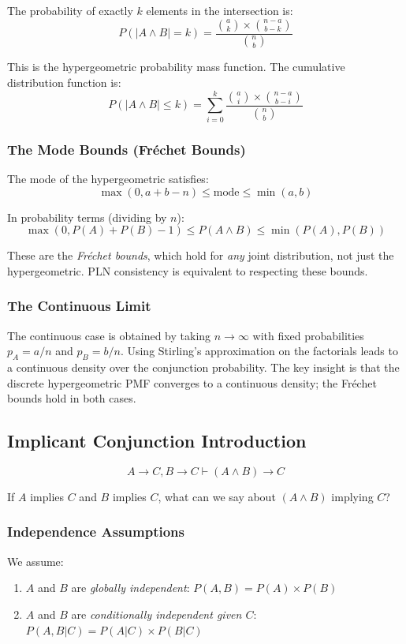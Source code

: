 \documentclass[]{article}
\begin{document}
The probability of exactly $k$ elements in the intersection is:
$$P(|A\land B|=k) = \frac{\binom{a}{k} \times \binom{n-a}{b-k}}{\binom{n}{b}}$$

This is the hypergeometric probability mass function.  The cumulative
distribution function is:
$$P(|A\land B| \leq k) = \sum_{i=0}^k \frac{\binom{a}{i} \times
  \binom{n-a}{b-i}}{\binom{n}{b}}$$

\subsubsection{The Mode Bounds (Fr\'{e}chet Bounds)}
The mode of the hypergeometric satisfies:
$$\max(0, a + b - n) \leq \text{mode} \leq \min(a, b)$$

In probability terms (dividing by $n$):
$$\max(0, P(A) + P(B) - 1) \leq P(A \land B) \leq \min(P(A), P(B))$$

These are the \emph{Fr\'{e}chet bounds}, which hold for \emph{any}
joint distribution, not just the hypergeometric.  PLN consistency is
equivalent to respecting these bounds.

\subsubsection{The Continuous Limit}
The continuous case is obtained by taking $n \to \infty$ with fixed
probabilities $p_A = a/n$ and $p_B = b/n$.  Using Stirling's
approximation on the factorials leads to a continuous density over the
conjunction probability.  The key insight is that the discrete
hypergeometric PMF converges to a continuous density; the Fr\'{e}chet
bounds hold in both cases.

\subsection{Implicant Conjunction Introduction}
\label{sec:implicantconj}
$$A \to C, B \to C \vdash (A \land B) \to C$$

If $A$ implies $C$ and $B$ implies $C$, what can we say about $(A
\land B)$ implying $C$?

\subsubsection{Independence Assumptions}
We assume:
\begin{enumerate}
\item $A$ and $B$ are \emph{globally independent}: $P(A,B) = P(A) \times P(B)$
\item $A$ and $B$ are \emph{conditionally independent given $C$}: $P(A,B|C) = P(A|C) \times P(B|C)$
\end{enumerate}
\end{document}
